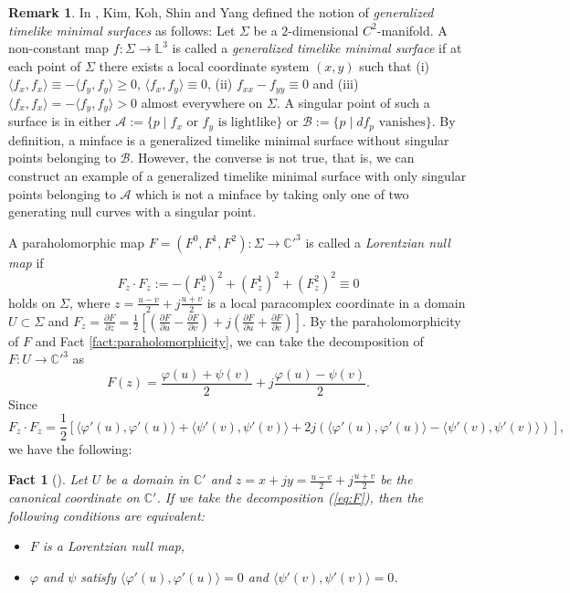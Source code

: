 \documentclass[11pt,reqno]{amsart}
\theoremstyle{plain} %
\newtheorem{fact}[theorem]{Fact}
\theoremstyle{definition}
\newtheorem{remark}[theorem]{Remark}
\begin{document}
\begin{remark}
In \cite{KKSY}, Kim, Koh, Shin and Yang defined the notion of {\it generalized timelike minimal surfaces} as follows: Let $\Sigma$ be a $2$-dimensional $C^2$-manifold. A non-constant map $f: \Sigma \longrightarrow \mathbb{L}^3$ is called a {\it generalized timelike minimal surface} if at each point of $\Sigma$ there exists a local coordinate system $(x, y)$ such that 
(i) $\langle f_x, f_x \rangle \equiv -\langle f_y, f_y \rangle \geq0$, $\langle f_x, f_y \rangle \equiv0$,
(ii) $f_{xx}-f_{yy}\equiv 0$ and
(iii) $\langle f_x, f_x \rangle = -\langle f_y, f_y \rangle >0$ almost everywhere on $\Sigma$. A singular point of such a surface is in either $\mathcal{A}:=\{p \mid \text{$f_x$  or $f_y$ is lightlike}\}$ or $\mathcal{B}:=\{p \mid \text{$df_p$ vanishes}\}$. By definition, a minface is a generalized timelike minimal surface without singular points belonging to $\mathcal{B}$. However, the converse is not true, that is, we can construct an example of a generalized timelike minimal surface with only singular points belonging to $\mathcal{A}$ which is not a minface by taking only one of two generating null curves with a singular point.
\end{remark}

A paraholomorphic map $F=(F^0,F^1,F^2): \Sigma \longrightarrow {\mathbb{C}'}^3$ is called a {\it Lorentzian null map} if 
\begin{equation*}
F_z\cdot F_z:= -(F^0_z)^2+(F^1_z)^2+(F^2_z)^2\equiv 0
\end{equation*}
holds on $\Sigma$, where $z=\frac{u-v}{2}+j\frac{u+v}{2}$ is a local paracomplex coordinate in a domain $U\subset \Sigma$ and $F_z=\frac{\partial F}{\partial z}=\frac{1}{2}\left[\left( \frac{\partial F}{\partial u}-\frac{\partial F}{\partial v}\right)+j\left( \frac{\partial F}{\partial u}+\frac{\partial F}{\partial v}\right)\right]$. By the paraholomorphicity of $F$ and Fact \ref{fact:paraholomorphicity}, we can take the decomposition of $F: U \longrightarrow {\mathbb{C}'}^3$ as 
\begin{equation}\label{eq:F}
F(z)=\frac{\varphi(u)+\psi(v)}{2}+j\frac{\varphi(u)-\psi(v)}{2}.
\end{equation}
Since 
\begin{equation*}
F_z\cdot F_z=\frac{1}{2}\left[\langle \varphi'(u), \varphi'(u) \rangle+\langle \psi'(v), \psi'(v) \rangle+2j\left(\langle \varphi'(u), \varphi'(u) \rangle-\langle \psi'(v), \psi'(v) \rangle\right)\right],
\end{equation*}
we have the following:
\begin{fact}[\cite{T}]\label{fact:Lorentzian null map}
Let $U$ be a domain in $\mathbb{C}'$ and $z=x+jy=\frac{u-v}{2}+j\frac{u+v}{2}$ be the canonical coordinate on $\mathbb{C}'$. If we take the decomposition (\ref{eq:F}), then the following conditions are equivalent:
\begin{itemize}
\item[(i)] $F$ is a Lorentzian null map, 
\item[(ii)] $\varphi$ and $\psi$ satisfy $\langle \varphi'(u), \varphi'(u) \rangle =0$ and $\langle \psi'(v), \psi'(v) \rangle =0$.
\end{itemize}
\end{fact}
\end{document}
